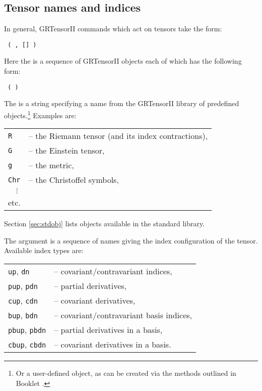 \documentclass{article}
\begin{document}
\subsection{Tensor names and indices}
%
In general, GRTensorII commands which act on tensors take the form:
\begin{center}
  \texttt{  ( ,
    [] )}
\end{center}
Here the  is a sequence of GRTensorII objects each of
which has the following form:
\begin{center}
  \texttt{  (  )}
\end{center}

The  is a string specifying a name from the
GRTensorII library of predefined objects.\footnote{Or a user-defined
object, as can be created via the methods outlined in Booklet
\grDefRef.} Examples are:
\begin{center}
  \begin{tabular}{ll}
    \texttt{R} & -- the Riemann tensor (and its index contractions),\\
    \texttt{G} & -- the Einstein tensor, \\
    \texttt{g} & -- the metric, \\
    \texttt{Chr} & -- the Christoffel symbols, \\
    $\quad\vdots$ & \\
    etc. &
  \end{tabular}
\end{center}
Section \ref{sec:stdobj} lists objects available in the standard library.

The argument  is a sequence of names giving the index
configuration of the tensor. Available index types are:
\begin{center}
  \begin{tabular}{ll}
    \texttt{up}, \texttt{dn} & -- covariant/contravariant indices,\\
    \texttt{pup}, \texttt{pdn} & -- partial derivatives,\\
    \texttt{cup}, \texttt{cdn} & -- covariant derivatives,\\
    \texttt{bup}, \texttt{bdn} & -- covariant/contravariant basis indices,\\
    \texttt{pbup}, \texttt{pbdn} & -- partial derivatives in a basis,\\
    \texttt{cbup}, \texttt{cbdn} & -- covariant derivatives in a basis.\\
  \end{tabular}
\end{center}
\end{document}

